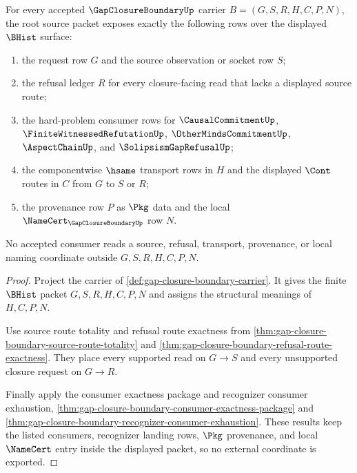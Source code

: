 \begin{theorem}
\label{thm:gap-closure-boundary-source-packet}
For every accepted $\GapClosureBoundaryUp$ carrier $B=(G,S,R,H,C,P,N)$, the root source packet exposes exactly the following rows over the displayed $\BHist$ surface:
\begin{enumerate}
\item the request row $G$ and the source observation or socket row $S$;
\item the refusal ledger $R$ for every closure-facing read that lacks a displayed source route;
\item the hard-problem consumer rows for $\CausalCommitmentUp$, $\FiniteWitnessedRefutationUp$, $\OtherMindsCommitmentUp$, $\AspectChainUp$, and $\SolipsismGapRefusalUp$;
\item the componentwise $\hsame$ transport rows in $H$ and the displayed $\Cont$ routes in $C$ from $G$ to $S$ or $R$;
\item the provenance row $P$ as $\Pkg$ data and the local $\NameCert_{\GapClosureBoundaryUp}$ row $N$.
\end{enumerate}
No accepted consumer reads a source, refusal, transport, provenance, or local naming coordinate outside $G,S,R,H,C,P,N$.
\end{theorem}
\begin{proof}
Project the carrier of \autoref{def:gap-closure-boundary-carrier}. It gives the finite $\BHist$ packet $G,S,R,H,C,P,N$ and assigns the structural meanings of $H,C,P,N$.

Use source route totality and refusal route exactness from \autoref{thm:gap-closure-boundary-source-route-totality} and \autoref{thm:gap-closure-boundary-refusal-route-exactness}. They place every supported read on $G \longrightarrow S$ and every unsupported closure request on $G \longrightarrow R$.

Finally apply the consumer exactness package and recognizer consumer exhaustion, \autoref{thm:gap-closure-boundary-consumer-exactness-package} and \autoref{thm:gap-closure-boundary-recognizer-consumer-exhaustion}. These results keep the listed consumers, recognizer landing rows, $\Pkg$ provenance, and local $\NameCert$ entry inside the displayed packet, so no external coordinate is exported.
\end{proof}

